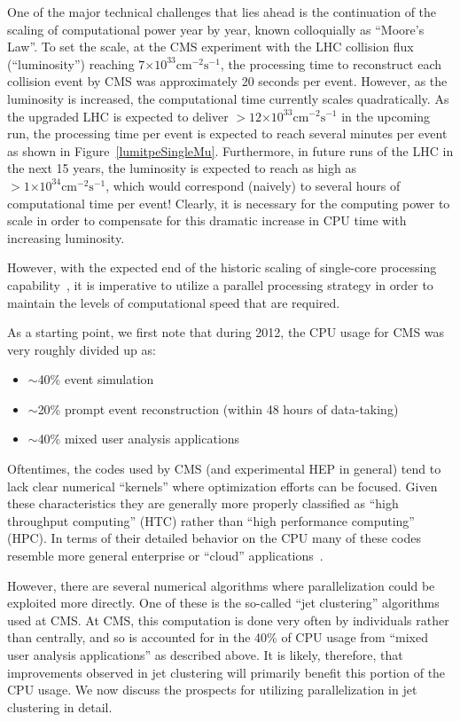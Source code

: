 \documentclass[12pt]{article}
\newcommand{\instlumiA}     {\ensuremath{\times 10^{33} \mathrm{cm}^{-2} \mathrm{s}^{-1}}}
\newcommand{\instlumiB}     {\ensuremath{\times 10^{34} \mathrm{cm}^{-2} \mathrm{s}^{-1}}}
\begin{document}
One of the major technical challenges that lies ahead is the
continuation of the scaling of computational power year by year, known
colloquially as ``Moore's Law''. 
To set the scale, at the CMS experiment
with the LHC collision flux (``luminosity'') reaching
$7\instlumiA$, the processing
time to reconstruct each collision event by CMS was approximately 20
seconds per event. However, as the luminosity is
increased, the computational time currently scales quadratically. As
the upgraded LHC is expected to deliver $>12\instlumiA$ in the
upcoming run, the processing time per event is expected to reach
several minutes per event as shown in
Figure~\ref{lumitpeSingleMu}. Furthermore, in future runs of the LHC
in the next 15 years, the luminosity is expected to reach as high as
$>1\instlumiB$, which would correspond (naively) to several hours of
computational time per event! Clearly, it is necessary for the
computing power to scale in order to compensate for this dramatic
increase in CPU time with increasing luminosity. 



However, with the expected end of the historic scaling of single-core
processing capability~\cite{GAMEOVER}, it is imperative to utilize a
parallel processing
strategy in order to maintain the levels of computational speed that
are required.

As a starting point, we first note that during 
2012, the CPU usage for CMS was very 
roughly divided up as:

\begin{itemize}
\item $\sim$40\% event simulation
\item $\sim$20\% prompt event reconstruction (within 48 hours of data-taking)
\item $\sim$40\% mixed user analysis applications
\end{itemize}

Oftentimes,
the codes used by CMS (and experimental HEP in general) tend to lack
clear numerical ``kernels'' where optimization efforts can be focused. 
Given these characteristics they are generally more properly classified as
``high throughput computing'' (HTC) rather than ``high performance computing'' (HPC). 
In terms of their detailed behavior on the CPU many of these codes resemble
more general enterprise or ``cloud''
applications~\cite{CLOUDSUITE,GOODACHEP}.

However, there are several numerical algorithms where parallelization
could be exploited more directly. One of these is the so-called ``jet
clustering'' algorithms used at CMS. 
At CMS, this computation is done very often by individuals rather than
centrally, and so is accounted for
in the 40\% of CPU usage from ``mixed user analysis applications'' as
described above. It is likely, therefore, that improvements observed
in jet clustering will primarily benefit this portion of the CPU
usage. We now discuss the prospects for
utilizing parallelization in jet clustering in detail. 
\end{document}
